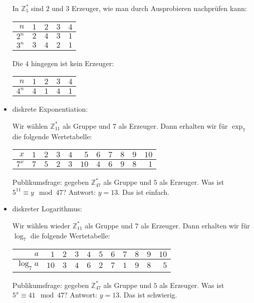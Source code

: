 \documentclass[
  a4paper,
  11pt,
]{article}
\newcommand{\Z}{\mathbb{Z}}
\begin{document}
\begin{itemize}
    In $\Z_5^*$ sind $2$ und $3$ Erzeuger, wie man durch Ausprobieren nachprüfen
    kann:
    \begin{center}
      \begin{tabular}{r|rrrr}
        $n$   & $1$ & $2$ & $3$ & $4$\\\hline
        $2^n$ & $2$ & $4$ & $3$ & $1$\\
        $3^n$ & $3$ & $4$ & $2$ & $1$
      \end{tabular}
    \end{center}
    Die $4$ hingegen ist kein Erzeuger:
    \begin{center}
      \begin{tabular}{r|rrrr}
        $n$   & $1$ & $2$ & $3$ & $4$\\\hline
        $4^n$ & $4$ & $1$ & $4$ & $1$
      \end{tabular}
    \end{center}

  \item diskrete Exponentiation:

    Wir wählen $\Z_{11}^*$ als Gruppe und $7$ als Erzeuger. Dann erhalten wir
    für $\exp_7$ die folgende Wertetabelle:
    \begin{center}
      \begin{tabular}{r|rrrrrrrrrr}
        $x$ & $1$ & $2$ & $3$ & $4$ & $5$ & $6$ & $7$ & $8$ & $9$ & $10$\\\hline
        $7^x$ & $7$ & $5$ & $2$ & $3$ & $10$ & $4$ & $6$ & $9$ & $8$ & $1$
      \end{tabular}
    \end{center}

    Publikumsfrage: gegeben $\Z_{47}^*$ als Gruppe und $5$ als Erzeuger. Was ist
    $5^{11} \equiv y \mod 47$? Antwort: $y = 13$. Das ist einfach.

  \item diskreter Logarithmus:

    Wir wählen wieder $\Z_{11}^*$ als Gruppe und $7$ als Erzeuger. Dann erhalten
    wir für $\log_7$ die folgende Wertetabelle:
    \begin{center}
      \begin{tabular}{r|rrrrrrrrrr}
        $a$ & $1$ & $2$ & $3$ & $4$ & $5$ & $6$ & $7$ & $8$ & $9$ & $10$\\\hline
        $\log_7 a$ & $10$ & $3$ & $4$ & $6$ & $2$ & $7$ & $1$ & $9$ & $8$ & $5$
      \end{tabular}
    \end{center}

    Publikumsfrage: gegeben $\Z_{47}^*$ als Gruppe und $5$ als Erzeuger. Was ist
    $5^x \equiv 41 \mod 47$? Antwort: $y = 13$. Das ist schwierig.

\end{itemize}
\end{document}

